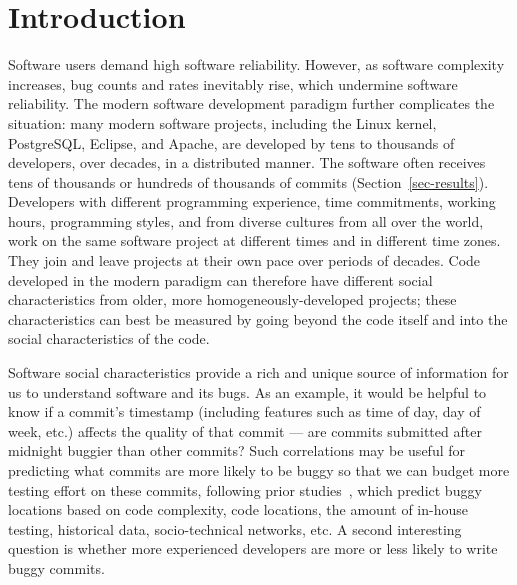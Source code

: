  

\section{Introduction}

Software users demand high software reliability. However, as software complexity
increases, bug counts and rates inevitably rise, which undermine software
reliability. The modern software development paradigm further complicates the
situation: many modern software projects, including the Linux kernel,
PostgreSQL, Eclipse, and Apache, are developed by tens to thousands of
developers, over decades, in a distributed manner. The software often receives
tens of thousands or hundreds of thousands of commits
(Section~\ref{sec-results}). Developers with different programming experience,
time commitments, working hours, programming
styles, and from diverse cultures from all over the world, work on the same
software project at different times and in different time zones. They join and
leave projects at their own pace over periods of decades. Code developed in the
modern paradigm can therefore have different social characteristics from older,
more homogeneously-developed projects; these characteristics can best be
measured by going beyond the code itself and into the social characteristics of
the code.

Software social characteristics provide a rich and unique source of information
for us to understand software and its bugs. As an example, it would be helpful
to know if a commit's timestamp (including features such as time of day, day of
week, etc.)  affects the quality of that commit --- are commits submitted after
midnight buggier than other commits?  Such correlations may be useful for
predicting what commits are more likely to be buggy so that we can budget more
testing effort on these commits, following prior
studies~\cite{graves00predicting, guo04robust, Hassan09, libre07, devNetwork08,
  predictionMenzies10, effort03, ostrand05predicting, depGraph08,
  zimmermann-promise-2007}, which predict buggy locations based on code
complexity, code locations, the amount of in-house testing, historical data,
socio-technical networks, etc. A second interesting question is whether more
experienced developers are more or less likely to write buggy commits.


